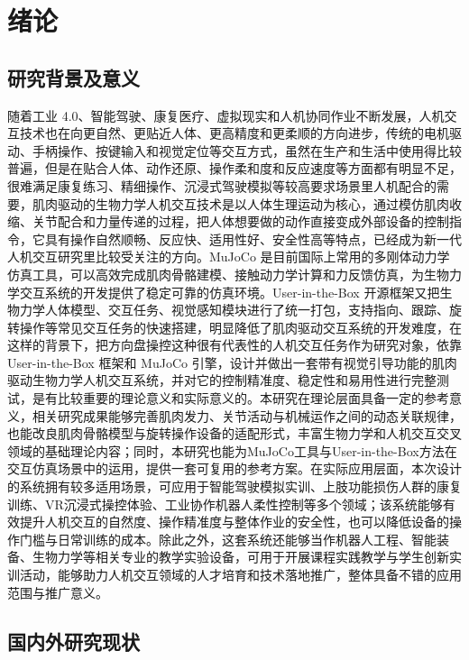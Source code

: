 \chapter{绪论}

\section{研究背景及意义}
随着工业 4.0、智能驾驶、康复医疗、虚拟现实和人机协同作业不断发展，人机交互技术也在向更自然、更贴近人体、更高精度和更柔顺的方向进步，传统的电机驱动、手柄操作、按键输入和视觉定位等交互方式，虽然在生产和生活中使用得比较普遍，但是在贴合人体、动作还原、操作柔和度和反应速度等方面都有明显不足，很难满足康复练习、精细操作、沉浸式驾驶模拟等较高要求场景里人机配合的需要，肌肉驱动的生物力学人机交互技术是以人体生理运动为核心，通过模仿肌肉收缩、关节配合和力量传递的过程，把人体想要做的动作直接变成外部设备的控制指令，它具有操作自然顺畅、反应快、适用性好、安全性高等特点，已经成为新一代人机交互研究里比较受关注的方向\cite{guntupalli2026comparing}。MuJoCo 是目前国际上常用的多刚体动力学仿真工具，可以高效完成肌肉骨骼建模、接触动力学计算和力反馈仿真，为生物力学交互系统的开发提供了稳定可靠的仿真环境。User-in-the-Box 开源框架又把生物力学人体模型、交互任务、视觉感知模块进行了统一打包，支持指向、跟踪、旋转操作等常见交互任务的快速搭建，明显降低了肌肉驱动交互系统的开发难度，在这样的背景下，把方向盘操控这种很有代表性的人机交互任务作为研究对象，依靠 User-in-the-Box 框架和 MuJoCo 引擎，设计并做出一套带有视觉引导功能的肌肉驱动生物力学人机交互系统，并对它的控制精准度、稳定性和易用性进行完整测试，是有比较重要的理论意义和实际意义的。本研究在理论层面具备一定的参考意义，相关研究成果能够完善肌肉发力、关节活动与机械运作之间的动态关联规律，也能改良肌肉骨骼模型与旋转操作设备的适配形式，丰富生物力学和人机交互交叉领域的基础理论内容；同时，本研究也能为MuJoCo工具与User-in-the-Box方法在交互仿真场景中的运用，提供一套可复用的参考方案。在实际应用层面，本次设计的系统拥有较多适用场景，可应用于智能驾驶模拟实训、上肢功能损伤人群的康复训练、VR沉浸式操控体验、工业协作机器人柔性控制等多个领域；该系统能够有效提升人机交互的自然度、操作精准度与整体作业的安全性，也可以降低设备的操作门槛与日常训练的成本。除此之外，这套系统还能够当作机器人工程、智能装备、生物力学等相关专业的教学实验设备，可用于开展课程实践教学与学生创新实训活动，能够助力人机交互领域的人才培育和技术落地推广，整体具备不错的应用范围与推广意义\cite{wang2026jiyu}。

\section{国内外研究现状}
